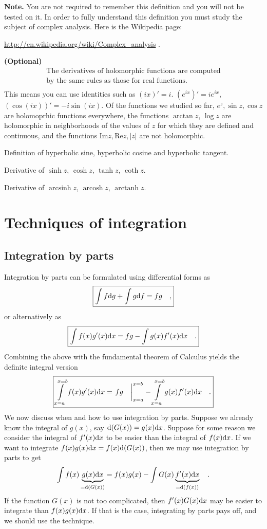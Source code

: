 \documentclass[12pt]{book}
\renewcommand{\Im}{\mathrm{Im}}
\renewcommand{\Re}{\mathrm{Re}}
\DeclareMathOperator{\arcsinh}{arcsinh}
\DeclareMathOperator{\arccosh}{arcosh}
\DeclareMathOperator{\arctanh}{arctanh}
\newcommand{\optionalMaterial}{\textbf{(Optional)}}
\begin{document}
\textbf{Note.} You are not required to remember this definition and you will not be tested on it. In order to fully understand this definition you must study the subject of complex analysis. Here is the Wikipedia page:

\url{http://en.wikipedia.org/wiki/Complex_analysis} \quad .

\optionalMaterial
\[\begin{array}{l}
\text{The derivatives of holomorphic functions are computed} \\
\text{by the same rules as those for real functions.} \\
\end{array}
\]
This means you can use identities such as $(ix)'=i$. $(e^{ix})'=ie^{ix}$, $(\cos (ix))'= -i\sin(ix)$. Of the functions we studied so far, $e^z, \sin z, \cos z$ are holomoprhic functions everywhere, the functions $\arctan z$, $\log z$ are holomorphic in neighborhoods of the values of $z$ for which they are defined and continuous, and the functions $\Im z, \Re z, |z|$ are not holomorphic.




Definition of hyperbolic sine, hyperbolic cosine and hyperbolic tangent.

Derivative of $\sinh z$, $\cosh z$, $\tanh z$, $\coth z$.

Derivative of $ \arcsinh z$, $ \arccosh z$, $ \arctanh z$.
\chapter{Techniques of integration}
\section{Integration by parts}
Integration by parts can be formulated using differential forms as
\begin{equation}\boxed{
\int f {\normalfont \text{d}} g+ \int g {\normalfont \text{d}} f = fg\quad,
}
\end{equation}
or alternatively as
\begin{equation}\boxed{
\int f(x) g'(x){\normalfont \text{d}} x = fg- \int g(x) f'(x){\normalfont \text{d}} x \quad .
}
\end{equation}
Combining the above with the fundamental theorem of Calculus yields the definite integral version
\begin{equation}\boxed{
\int\limits_{x=a}^{x=b} f(x) g'(x)\diff x = \left.fg\phantom\int\right|_{x=a}^{x=b} - \int\limits_{x=a}^{x=b} g(x) f'(x)\diff x \quad.
}
\end{equation}
We now discuss when and how to use integration by parts. Suppose we already know the integral of $g(x)$, say ${\normalfont \text{d}} (G(x))=g(x){\normalfont \text{d}} x$. Suppose for some reason we consider the integral of $f'(x){\normalfont \text{d}} x$ to be easier than the integral of $f(x){\normalfont \text{d}} x$. If we want to integrate $f(x)g(x){\normalfont \text{d}} x= f(x){\normalfont \text{d}} (G(x))$, then we may use integration by parts to get
\[
\int f(x)\underbrace{g(x){\normalfont \text{d}} x}_{={\normalfont \text{d}} (G(x))}= f(x)g(x)- \int G(x) \underbrace{f'(x){\normalfont \text{d}} x}_{={\normalfont \text{d}} (f(x))}\quad .
\]
If the function $G(x)$ is not too complicated, then $f'(x)G(x){\normalfont \text{d}} x$ may be easier to integrate than $f(x)g(x){\normalfont \text{d}} x$. If that is the case, integrating by parts pays off, and we should use the technique.
\end{document}
